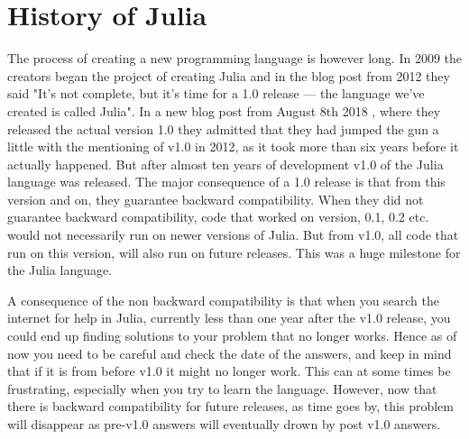 \section{History of Julia}
The process of creating a new programming language is however long. In 2009 the creators began the project of creating Julia and in the blog post \emph{\citep{juliaBlogRelease2012}} from 2012 they said "It’s not complete, but it’s time for a 1.0 release — the language we’ve created is called Julia". In a new blog post from August 8th 2018 \emph{\citep{juliaBlogReleaseV1.0}}, where they released the actual version 1.0 they admitted that they had jumped the gun a little with the mentioning of v1.0 in 2012, as it took more than six years before it actually happened. But after almost ten years of development v1.0 of the Julia language was released. The major consequence of a 1.0 release is that from this version and on, they guarantee backward compatibility. When they did not guarantee backward compatibility, code that worked on version, 0.1, 0.2 etc. would not necessarily run on newer versions of Julia. But from v1.0, all code that run on this version, will also run on future releases. This was a huge milestone for the Julia language. 

A consequence of the non backward compatibility is that when you search the internet for help in Julia, currently less than one year after the v1.0 release, you could end up finding solutions to your problem that no longer works. Hence as of now you need to be careful and check the date of the answers, and keep in mind that if it is from before v1.0 it might no longer work. This can at some times be frustrating, especially when you try to learn the language. However, now that there is backward compatibility for future releases, as time goes by, this problem will disappear as pre-v1.0 answers will eventually drown by post v1.0 answers.

